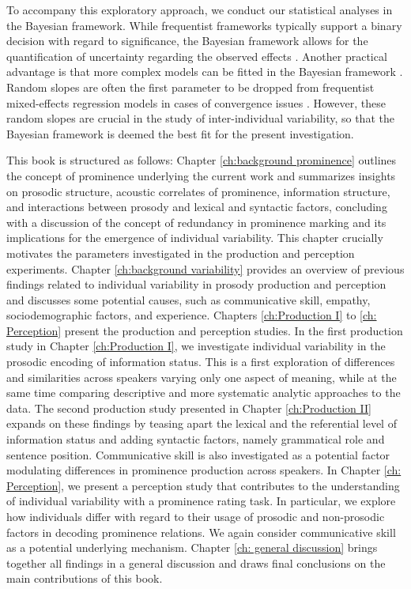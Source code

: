 To accompany this exploratory approach, we conduct our statistical analyses in the Bayesian framework. While frequentist frameworks typically support a binary decision with regard to significance, the Bayesian framework allows for the quantification of uncertainty regarding the observed effects \citep{vasishthBayesianDataAnalysis2018}. Another practical advantage is that more complex models can be fitted in the Bayesian framework \citep{vasishthBayesianDataAnalysis2018}. Random slopes are often the first parameter to be dropped from frequentist mixed-effects regression models in cases of convergence issues \citep{barrRandomEffectsStructure2013}. However, these random slopes are crucial in the study of inter-individual variability, so that the Bayesian framework is deemed the best fit for the present investigation.

This book is structured as follows: Chapter \ref{ch:background prominence} outlines the concept of prominence underlying the current work and summarizes insights on prosodic structure, acoustic correlates of prominence, information structure, and interactions between prosody and lexical and syntactic factors, concluding with a discussion of the concept of redundancy in prominence marking and its implications for the emergence of individual variability. This chapter crucially motivates the parameters investigated in the production and perception experiments. Chapter \ref{ch:background variability} provides an overview of previous findings related to individual variability in prosody production and perception and discusses some potential causes, such as communicative skill, empathy, sociodemographic factors, and experience. Chapters \ref{ch:Production I} to \ref{ch: Perception} present the production and perception studies. In the first production study in Chapter \ref{ch:Production I}, we investigate individual variability in the prosodic encoding of information status. This is a first exploration of differences and similarities across speakers varying only one aspect of meaning, while at the same time comparing descriptive and more systematic analytic approaches to the data. The second production study presented in Chapter \ref{ch:Production II} expands on these findings by teasing apart the lexical and the referential level of information status and adding syntactic factors, namely grammatical role and sentence position. Communicative skill is also investigated as a potential factor modulating differences in prominence production across speakers. In Chapter \ref{ch: Perception}, we present a perception study that contributes to the understanding of individual variability with a prominence rating task. In particular, we explore how individuals differ with regard to their usage of prosodic and non-prosodic factors in decoding prominence relations. We again consider communicative skill as a potential underlying mechanism. Chapter \ref{ch: general discussion} brings together all findings in a general discussion and draws final conclusions on the main contributions of this book.